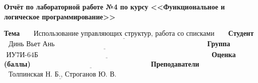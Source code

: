 \begin{titlepage}
	
	\begin{center}
		\Large\textbf{Отчёт по лабораторной работе №4 по курсу <<Функциональное и логическое программирование>>}
	\end{center}
	
	\bigskip\bigskip
	
	\noindent\textbf{Тема} $\underline{\text{~~~~~Использование управляющих структур, работа со списками~~~~~}}$\newline\newline\newline
	\noindent\textbf{Студент} $\underline{\text{~~Динь Вьет Ань~~~~~~~~~~~~~~~~~~~~~~~~~~~~~~~~~~~~~~~~~~~~~~~~~~~~~~~~~~~~~~~~~}}$\newline\newline
	\noindent\textbf{Группа} $\underline{\text{~ИУ7И-64Б~~~~~~~~~~~~~~~~~~~~~~~~~~~~~~~~~~~~~~~~~~~~~~~~~~~~~~~~~~~~~~~~~~~~~~~~~~}}$\newline\newline
	\noindent\textbf{Оценка (баллы)} $\underline{\text{~~~~~~~~~~~~~~~~~~~~~~~~~~~~~~~~~~~~~~~~~~~~~~~~~~}}$\newline\newline
	\noindent\textbf{Преподаватели} $\underline{\text{~~Толпинская~Н.~Б., Строганов~Ю.~В.}}$\newline

 \restoregeometry
\end{titlepage}
